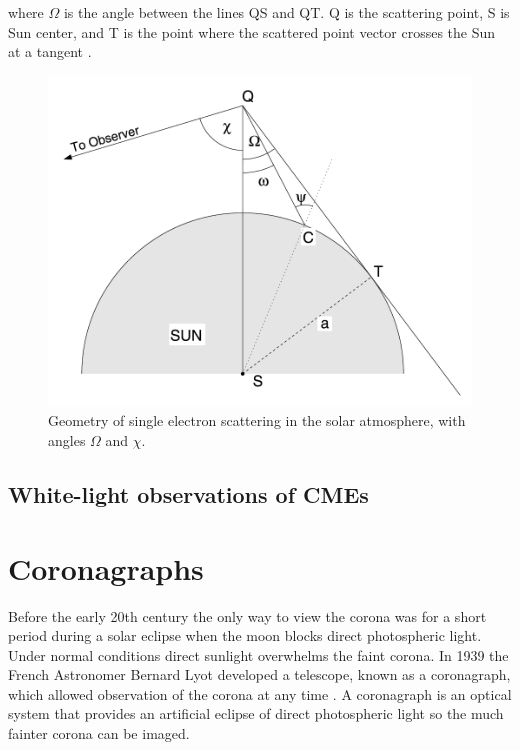 where $\Omega$ is the angle between the lines QS and QT. Q is the scattering point, S is Sun center, and T is the point where the scattered point vector crosses the Sun at a tangent \citep{howtap2009}.

\begin{figure}[h!]
\begin{center}
\includegraphics[scale=0.3, angle=0]{images/Omega}
\caption[Coronal Thomson scattering geometry]{Geometry of single electron scattering in the solar atmosphere, with angles $\Omega$ and $\chi$.}
\end{center}
\end{figure}


\subsection{White-light observations of CMEs}\label{sec:11}


\section{Coronagraphs}
Before the early 20th century the only way to view the corona was for a short period during a solar eclipse when the moon blocks direct photospheric light. Under normal conditions direct sunlight overwhelms the faint corona. In 1939 the French Astronomer Bernard Lyot developed a telescope, known as a coronagraph, which allowed observation of the corona at any time \citep{lyot1939}. A coronagraph is an optical system that provides an artificial eclipse of direct photospheric light so the much fainter corona can be imaged.

